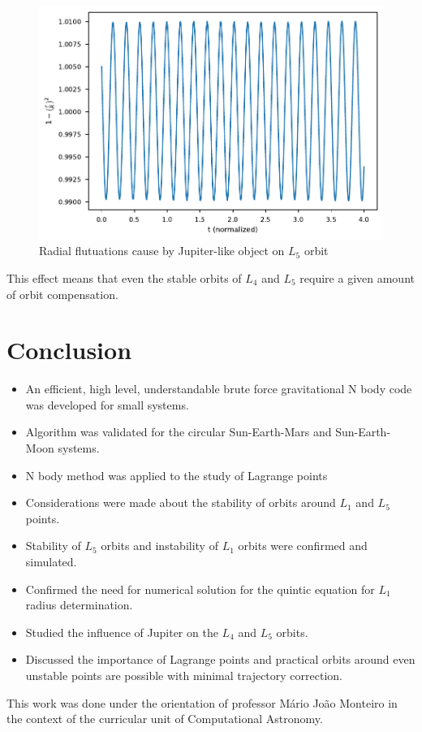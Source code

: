 \documentclass{aa}
\begin{document}
\begin{figure}[h!]
  \centering
  \includegraphics[width=\linewidth]{figs/l5_d_jup.pdf}
  \caption{Radial flutuations cause by Jupiter-like object on $L_5$ orbit}
  \label{fig:l5_jup}
\end{figure}

This effect means that even the stable orbits of $L_4$ and $L_5$ require a given
amount of orbit compensation.

\newpage

\section{Conclusion}

\begin{itemize}
\item An efficient, high level, understandable brute force gravitational N body
  code was developed for small systems.
\item Algorithm was validated for the circular Sun-Earth-Mars and Sun-Earth-Moon systems.
\item N body method was applied to the study of Lagrange points
\item Considerations were made about the stability of orbits around $L_1$ and
  $L_5$ points.
\item Stability of $L_5$ orbits and instability of $L_1$ orbits were confirmed
  and simulated.
\item Confirmed the need for numerical solution for the quintic equation for $L_1$ radius determination.
\item Studied the influence of Jupiter on the $L_4$ and $L_5$ orbits.
\item Discussed the importance of Lagrange points and practical orbits around
  even unstable points are possible with minimal trajectory correction.
\end{itemize}

\begin{acknowledgements}
  This work was done under the orientation of professor Mário João Monteiro in the
  context of the curricular unit of Computational Astronomy.
\end{acknowledgements}



\end{document}
